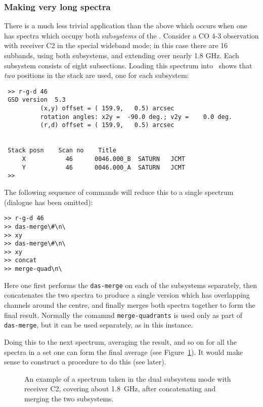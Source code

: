 \subsubsection{Making very long spectra}
\label{sec:long-spectra}
There is a much less trivial application than the above which occurs
when one has spectra which occupy both sub{\it systems} of the \das .
Consider a CO 4-3 observation with receiver C2 in the
special wideband mode; in this case there are 16 subbands, using both
subsystems, and extending over nearly 1.8 GHz. Each subsystem consists
of eight subsections.  Loading this spectrum into \SPECX\ shows that
{\it two} positions in the stack are used, one for each subsystem:

\begin{verbatim}
 >> r-g-d 46
 GSD version  5.3
          (x,y) offset = ( 159.9,   0.5) arcsec
          rotation angles: x2y =  -90.0 deg.; v2y =    0.0 deg.
          (r,d) offset = ( 159.9,   0.5) arcsec
 
 
 Stack posn    Scan no    Title
     X           46      0046.000_B  SATURN   JCMT 
     Y           46      0046.000_A  SATURN   JCMT 
 >> 
\end{verbatim}

The following sequence of commands will reduce this to a single
spectrum (dialogue has been omitted):

\begin{verbatim}
>> r-g-d 46
>> das-merge\#\n\
>> xy
>> das-merge\#\n\
>> xy
>> concat
>> merge-quad\n\
\end{verbatim}

Here one first performs the {\tt das-merge} on each of the subsystems
separately, then concatenates the two spectra to produce a single
version which has overlapping channels around the centre, and finally
merges both spectra together to form the final result. Normally the
comamnd {\tt merge-quadrants} is used only as part of {\tt das-merge},
but it can be used separately, as in this instance.

Doing this to the next spectrum, averaging the result, and so on for
all the spectra in a set one can form the final average (see
Figure~\ref{fig:concatenation}). It would make sense to construct a
procedure to do this (see later).

\begin{figure}[htb]
\centering
\leavevmode
\epsfysize=3.2in
\vspace*{-0.5cm}
\begin{center}
\begin{minipage}[t]{5in}
\caption[Extreme wideband spectra (concatenation)]
{\small{An example of a spectrum taken in the dual subsystem mode with
receiver C2, covering about 1.8~GHz, after concatenating and merging 
the two subsystems.
 }}
\label{fig:concatenation}
\end{minipage}
\end{center}
\end{figure}

